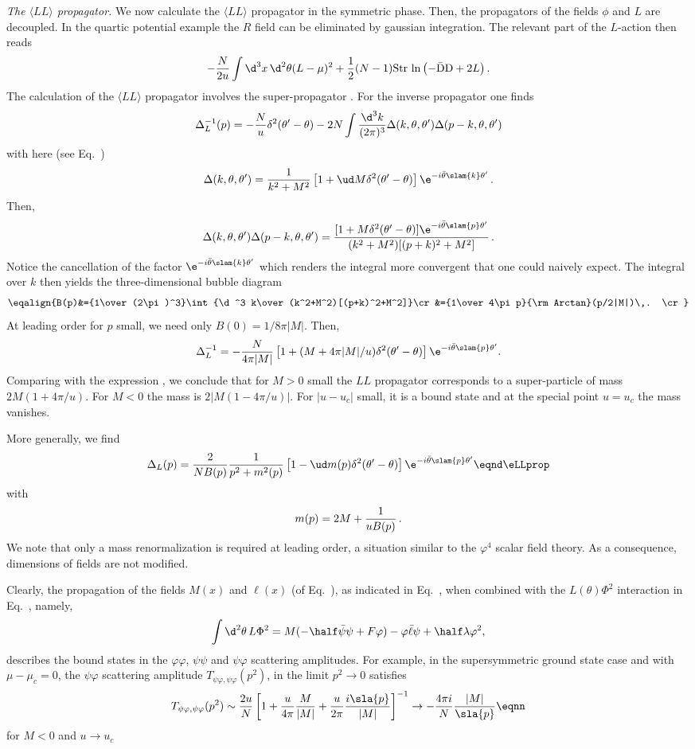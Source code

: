 {\it The $\langle LL \rangle$ propagator.}
We now calculate the $\langle LL\rangle$
propagator in the
symmetric phase. Then, the propagators of the fields $\phi$ and $L$ are
decoupled. In the quartic potential example the $R$ field can be
eliminated by gaussian integration. The relevant part of the $L$-action then
reads
$$-{N\over 2u}\int\d^3 x\,\d^2\theta(L-\mu)^2+{1\over2} (N-1) {\rm Str}\,
\ln\left(-\bar {\rm D} {\rm D}+2L\right) . $$
The calculation of the $\langle LL \rangle$ propagator  involves the
super-propagator \esupprop. For the inverse propagator  one
finds
$$\Delta_L^{-1}(p)=-{N\over u}\delta^2(\theta'-\theta)
-2N\int{\d^3 k\over(2\pi)^3}
\Delta(k,\theta,\theta')\Delta(p-k,\theta,\theta')  $$
with here (see Eq.~\eSUSYiipt)
$$\Delta(k,\theta,\theta')={1\over k^2+M^2}\left[1+\ud
M\delta^2(\theta'-\theta) \right]\e^{-i \bar\theta \slam{k}\theta'}\,. $$
Then,
$$\Delta(k,\theta,\theta')\Delta(p-k,\theta,\theta')
={[1+M \delta^2(\theta'-\theta)]\e^{-i \bar\theta \slam{p}\theta'}
\over (k^2+M^2)[(p+k)^2+M^2]}\,. $$
Notice the cancellation of the factor $\e^{-i \bar\theta \slam{k}\theta'}$
which renders the integral more convergent that one could naively expect.
The integral over $k$ then yields the three-dimensional bubble diagram
$$\eqalign{B(p)&={1\over(2\pi)^3}\int{\d^3 k\over  (k^2+M^2)[(p+k)^2+M^2]}\cr
&={1\over4\pi p}{\rm Arctan}(p/2|M|)\,. \cr}
$$
At leading order for $p$ small, we need only $B(0)=1/8\pi |M|$. Then,
$$\Delta_L^{-1}=
-{N\over4\pi |M|}\left[1+(M +4\pi |M|/u )
\delta^2(\theta'-\theta)\right]\e^{-i \bar\theta \slam{p}\theta'}.
$$
Comparing with the expression \eSUSYker, we conclude that for
$M>0$ small the $LL$ propagator corresponds to a super-particle of
mass $2M (1+4\pi/u ) $. For $M<0$ the mass is $2|M(1-4\pi/u)|$.
For $|u-u_c|$ small, it is a bound state and at the special point
$u=u_c$ the mass vanishes.\par
More generally, we find
$$\Delta_L(p)={2\over NB(p)}
{1\over p^2+m^2(p)}\left[1-\ud m(p)\delta^2(\theta'-\theta)\right]
\e^{-i \bar\theta \slam{p}\theta'} \eqnd\eLLprop$$
with
$$m(p)=2M+{1\over  u B(p)}\,.$$
We note that only a mass renormalization is required at leading order, a situation similar to the $\varphi^4$ scalar field theory.
As a consequence, dimensions of fields are not modified.\par

Clearly, the propagation of  the fields $M(x)$  and $\ell(x)$  (of
Eq.~\eLsupField), as indicated in Eq.~\eLLprop, when combined with
the $ L(\theta)\Phi^2$ interaction in Eq.~\eactLagm, namely,
$$  \int\d^2\theta\,L\Phi^2 =M(-\half\bar\psi\psi+F\varphi )
-\varphi\bar\ell \psi+\half\lambda \varphi^2 ,$$
describes the
bound states in the $\varphi\varphi$, $\psi\psi$ and $\psi\varphi$
scattering amplitudes. For example, in the supersymmetric ground
state case and with $\mu-\mu_c=0 $, the $\psi\varphi$ scattering
amplitude $T_{\psi\varphi,\psi\varphi}(p^2)$, in the limit $p^2
\to 0$ satisfies
$$T_{\psi\varphi,\psi\varphi}(p^2) \sim {2u\over
N}\left[1+ {u\over 4\pi}{M\over |M|} +{u\over 2\pi}{i\sla{p} \over
|M|} \right]^{-1}  \to -{4\pi i\over N}{|M|\over \sla{p}} \eqnn $$
for  $M<0$ and $u \to u_c$

